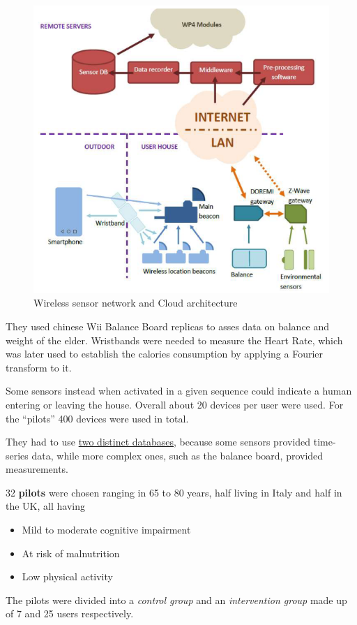 \begin{figure}[htbp]
   \centering
   \includegraphics{images/doremi_netarch.png}
   \caption{Wireless sensor network and Cloud architecture}
   \label{fig:doremi_netarch}
\end{figure}

They used chinese Wii Balance Board replicas to asses data on balance and weight of the elder.
Wristbands were needed to measure the Heart Rate, which was later used to establish the calories consumption by applying a Fourier transform to it.

Some sensors instead when activated in a given sequence could indicate a human entering or leaving the house.
Overall about 20 devices per user were used. For the ``pilots'' 400 devices were used in total.

They had to use \ul{two distinct databases}, because some sensors provided time-series data, while more complex ones, such as the balance board, provided measurements.


32 \textbf{pilots} were chosen ranging in 65 to 80 years, half living in Italy and half in the UK, all having 
\begin{itemize}
   \item Mild to moderate cognitive impairment
   \item At risk of malnutrition
   \item Low physical activity
\end{itemize}
The pilots were divided into a \textit{control group} and an \textit{intervention group} made up of 7 and 25 users respectively.

